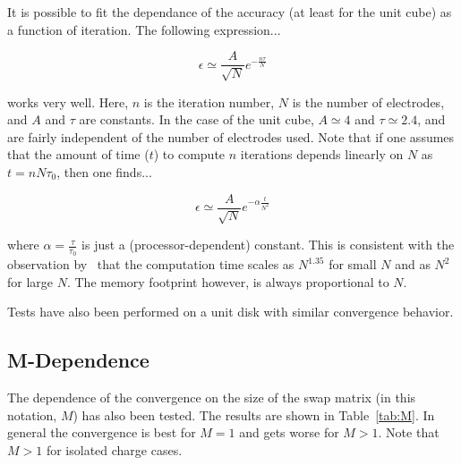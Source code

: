 It is possible to fit the dependance of the accuracy (at least for the unit cube) as a function of iteration.  The following expression...

\begin{equation}
\epsilon \simeq \frac{A}{\sqrt{N}} e^{-\frac{n \tau}{N}}
\end{equation}

\noindent works very well.  Here, $n$ is the iteration number, $N$ is the number of electrodes, and $A$ and $\tau$ are constants.  In the case of the unit cube, $A\simeq 4$ and $\tau \simeq 2.4$, and are fairly independent of the number of electrodes used.  Note that if one assumes that the amount of time ($t$) to compute $n$ iterations depends linearly on $N$ as $t = n N \tau_0$, then one finds...

\begin{equation}
\epsilon \simeq \frac{A}{\sqrt{N}} e^{-\alpha \frac{t}{N^2}}
\end{equation}

\noindent where $\alpha = \frac{\tau}{\tau_0}$ is just a (processor-dependent) constant.  This is consistent with the observation by~\cite{RH1,RH2} that the computation time scales as $N^{1.35}$ for small $N$ and as $N^2$ for large $N$.  The memory footprint however, is always proportional to $N$.

Tests have also been performed on a unit disk with similar convergence behavior.

\subsection{M-Dependence}

The dependence of the convergence on the size of the swap matrix (in this notation, $M$) has also been tested.  The results are shown in Table~\ref{tab:M}.  In general the convergence is best for $M=1$ and gets worse for $M>1$.  Note that $M>1$ for isolated charge cases.

